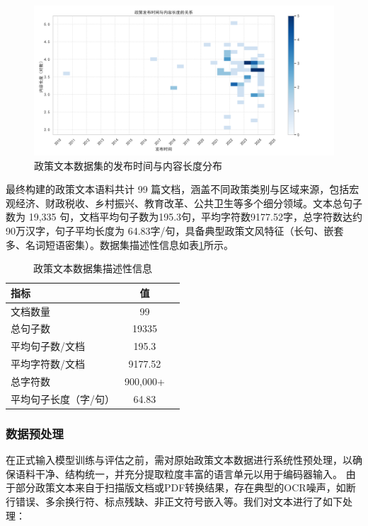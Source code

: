 \documentclass[12pt, a4paper]{ctexart}
\begin{document}
\begin{figure}[H]
    \centering
    \includegraphics[width=1\textwidth]{images/policy_pubtime_log_content_length.png}
    \caption{政策文本数据集的发布时间与内容长度分布}
    \label{fig:policy_pubtime_log_content_length}
\end{figure}


最终构建的政策文本语料共计 99 篇文档，涵盖不同政策类别与区域来源，包括宏观经济、财政税收、乡村振兴、教育改革、公共卫生等多个细分领域。文本总句子数为 19,335 句，文档平均句子数为195.3句，平均字符数9177.52字，总字符数达约90万汉字，句子平均长度为 64.83字/句，具备典型政策文风特征（长句、嵌套多、名词短语密集）。数据集描述性信息如表\ref{tab:policy_dataset_description}所示。

\begin{table}[H]
    \renewcommand{\arraystretch}{1}
    \centering
    \caption{政策文本数据集描述性信息}
    \label{tab:policy_dataset_description}
    \begin{tabular}{lcc}
        \toprule
        \textbf{指标} & \textbf{值} \\ 
        \midrule
        文档数量 & 99 \\
        总句子数 & 19335 \\
        平均句子数/文档 & 195.3 \\
        平均字符数/文档 & 9177.52 \\ 
        总字符数 & 900,000+ \\ 
        平均句子长度（字/句） & 64.83 \\
        \bottomrule
    \end{tabular}
\end{table}

\subsubsection{数据预处理}
在正式输入模型训练与评估之前，需对原始政策文本数据进行系统性预处理，以确保语料干净、结构统一，并充分提取粒度丰富的语言单元以用于编码器输入。
由于部分政策文本来自于扫描版文档或PDF转换结果，存在典型的OCR噪声，如断行错误、多余换行符、标点残缺、非正文符号嵌入等。我们对文本进行了如下处理：
\end{document}
